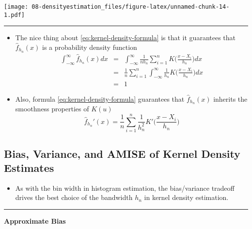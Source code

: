 \documentclass[]{book}
\providecommand{\tightlist}{%
  \setlength{\itemsep}{0pt}\setlength{\parskip}{0pt}}
\begin{document}
\texttt{[image: 08-densityestimation\_files/figure-latex/unnamed-chunk-14-1.pdf]}

\begin{center}\rule{0.5\linewidth}{\linethickness}\end{center}

\begin{itemize}
\item
  The nice thing about \eqref{eq:kernel-density-formula} is that it guarantees that \(\hat{f}_{h_{n}}(x)\) is a probability
  density function
  \begin{eqnarray}
  \int_{-\infty}^{\infty} \hat{f}_{h_{n}}(x) dx 
  &=& \int_{-\infty}^{\infty} \frac{1}{nh_{n}} \sum_{i=1}^{n} K\Big( \frac{x - X_{i}}{h_{n}} \Big)  dx  \nonumber \\
  &=&  \frac{1}{n} \sum_{i=1}^{n} \int_{-\infty}^{\infty} \frac{1}{h_{n}} K\Big( \frac{x - X_{i}}{h_{n}} \Big) dx  \nonumber \\
  &=& 1 \nonumber
  \end{eqnarray}
\item
  Also, formula \eqref{eq:kernel-density-formula} guarantees that \(\hat{f}_{h_{n}}(x)\) inherits the smoothness properties
  of \(K(u)\)
  \begin{equation}
  \hat{f}_{h_{n}}'(x) = \frac{1}{n} \sum_{i=1}^{n} \frac{1}{h_{n}^{2}} K'\Big( \frac{x - X_{i}}{h_{n}} \Big)  \nonumber
  \end{equation}
\end{itemize}

\hypertarget{bias-variance-and-amise-of-kernel-density-estimates}{%
\subsection{Bias, Variance, and AMISE of Kernel Density Estimates}\label{bias-variance-and-amise-of-kernel-density-estimates}}

\begin{itemize}
\tightlist
\item
  As with the bin width in histogram estimation, the bias/variance tradeoff
  drives the best choice of the bandwidth \(h_{n}\) in kernel density estimation.
\end{itemize}

\begin{center}\rule{0.5\linewidth}{\linethickness}\end{center}

\textbf{Approximate Bias}
\end{document}
